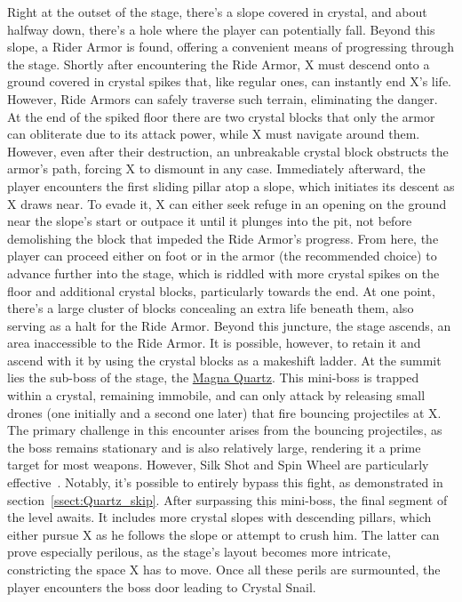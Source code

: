 Right at the outset of the stage, there's a slope covered in crystal, and about halfway down, there's a hole where the player can potentially fall. Beyond this slope, a Rider Armor is found, offering a convenient means of progressing through the stage. Shortly after encountering the Ride Armor, X must descend onto a ground covered in crystal spikes that, like regular ones, can instantly end X's life. However, Ride Armors can safely traverse such terrain, eliminating the danger. At the end of the spiked floor there are two crystal blocks that only the armor can obliterate due to its attack power, while X must navigate around them. However, even after their destruction, an unbreakable crystal block obstructs the armor's path, forcing X to dismount in any case. Immediately afterward, the player encounters the first sliding pillar atop a slope, which initiates its descent as X draws near. To evade it, X can either seek refuge in an opening on the ground near the slope's start or outpace it until it plunges into the pit, not before demolishing the block that impeded the Ride Armor's progress. From here, the player can proceed either on foot or in the armor (the recommended choice) to advance further into the stage, which is riddled with more crystal spikes on the floor and additional crystal blocks, particularly towards the end. At one point, there's a large cluster of blocks concealing an extra life beneath them, also serving as a halt for the Ride Armor. Beyond this juncture, the stage ascends, an area inaccessible to the Ride Armor. It is possible, however, to retain it and ascend with it by using the crystal blocks as a makeshift ladder. At the summit lies the sub-boss of the stage, the \hyperlink{miniboss:Magna_Quartz}{Magna Quartz}. This mini-boss is trapped within a crystal, remaining immobile, and can only attack by releasing small drones (one initially and a second one later) that fire bouncing projectiles at X. The primary challenge in this encounter arises from the bouncing projectiles, as the boss remains stationary and is also relatively large, rendering it a prime target for most weapons. However, Silk Shot and Spin Wheel are particularly effective~\cite{wiki:Magna_quartz}. Notably, it's possible to entirely bypass this fight, as demonstrated in section~\ref{ssect:Quartz_skip}. After surpassing this mini-boss, the final segment of the level awaits. It includes more crystal slopes with descending pillars, which either pursue X as he follows the slope or attempt to crush him. The latter can prove especially perilous, as the stage's layout becomes more intricate, constricting the space X has to move. Once all these perils are surmounted, the player encounters the boss door leading to Crystal Snail.

